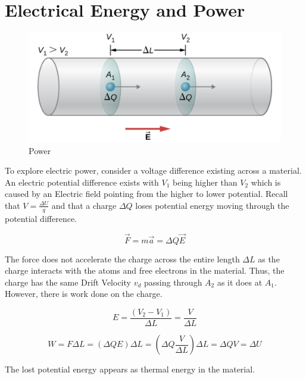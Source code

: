 \documentclass[14pt]{memoir}
\begin{document}
\section{Electrical Energy and Power}

\begin{figure}[H]
\begin{center}
\includegraphics[scale=0.50]{fig/fig_09_24.jpg}
\caption{Power}
\label{fig:09_24}
\end{center}
\end{figure}

To explore electric power, consider a voltage difference existing across a material. An electric potential difference exists with $V_1$ being higher than $V_2$ which is caused by an Electric field pointing from the higher to lower potential. Recall that $V = \frac{\Delta U}{q}$ and that a charge $\Delta Q$ loses potential energy moving through the potential difference.

\begin{equation}
\vec{F} = m \vec{a} = \Delta Q \vec{E}
\end{equation}

The force does not accelerate the charge across the entire length $\Delta L$ as the charge interacts with the atoms and free electrons in the material. Thus, the charge has the same Drift Velocity $v_d$ passing through $A_2$ as it does at $A_1$. However, there is work done on the charge. 

\begin{equation}
E = \frac{(V_2 - V_1)}{\Delta L} = \frac{V}{\Delta L}
\end{equation}

\begin{equation}
W = F \Delta L = (\Delta Q E) \Delta L = (\Delta Q \frac{V}{\Delta L})\Delta L = \Delta Q V = \Delta U
\end{equation}

The lost potential energy appears as thermal energy in the material. 
\end{document}
